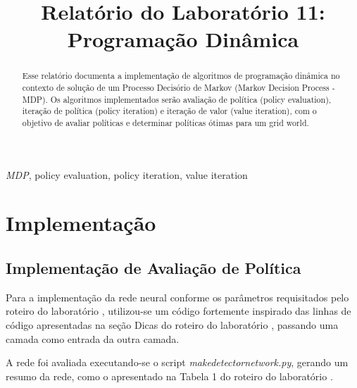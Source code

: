 \documentclass[conference]{IEEEtran}
\begin{document}
\title{Relatório do Laboratório 11: \\ Programação Dinâmica\\
}

\author{
}

\maketitle

\begin{abstract}
Esse relatório documenta a implementação de algoritmos de programação dinâmica no contexto de solução de um Processo Decisório de Markov (Markov Decision Process - MDP). Os algoritmos implementados serão avaliação de política (policy evaluation), iteração de política (policy iteration) e iteração de valor (value iteration), com o objetivo de avaliar políticas e determinar políticas ótimas para um grid world.
\end{abstract}

\begin{IEEEkeywords}
\textit{MDP}, policy evaluation, policy iteration, value iteration
\end{IEEEkeywords}

\section{Implementação}

\subsection{Implementação de Avaliação de Política}
Para a implementação da rede neural conforme os parâmetros requisitados pelo roteiro do laboratório \cite{roteiro}, utilizou-se um código fortemente inspirado das linhas de código apresentadas na seção Dicas do roteiro do laboratório \cite{roteiro}, passando uma camada como entrada da outra camada.

A rede foi avaliada executando-se o script \textit{make\underline{\space}detector\underline{\space}network.py}, gerando um resumo da rede, como o apresentado na Tabela 1 do roteiro do laboratório \cite{roteiro}.
\end{document}
